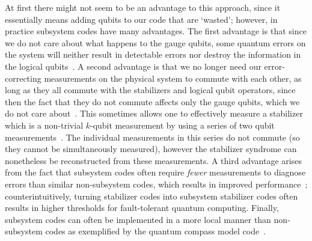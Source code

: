 \documentclass[twocolumn,showpacs,preprintnumbers,amsmath,amssymb,nofootinbib,pra,floatfix]{revtex4-1}
\begin{document}
At first there might not seem to be an advantage to this approach, since it essentially means adding qubits to our code that are
`wasted'; however, in practice subsystem codes have many advantages.  The first advantage is that since we do not care about what happens to the gauge qubits, some quantum errors on the system will neither result in detectable errors nor destroy the information in the logical qubits~\cite{Poulin:05a,Kribs:05a,Kribs:05b,Nielsen:05a,Kribs:06a,Bacon:06a}.  A second advantage is that we no longer need our error-correcting measurements on the physical system to commute with each other, as long as they all commute with the stabilizers and logical qubit operators, since then the fact that they do not commute affects only the gauge qubits, which we do not care about~\cite{Aliferis:07a}.  This sometimes allows one to effectively measure a stabilizer which is a non-trivial $k$-qubit measurement by using a series of two qubit measurements~\cite{Aliferis:07a}.  The individual measurements in this series do not commute (so they cannot be simultaneously measured), however the stabilizer syndrome can nonetheless be reconstructed from these measurements.  A third advantage arises from the fact that subsystem codes often require {\em fewer} measurements to diagnose errors than similar non-subsystem codes, which results in improved performance~\cite{Aliferis:07a,Cross:07a};  counterintuitively, turning stabilizer codes into subsystem stabilizer codes often results in higher thresholds for fault-tolerant quantum computing.  Finally, subsystem codes can often be implemented in a more local manner than non-subsystem codes as exemplified by the quantum compass model code~\cite{Bacon:06a,Aliferis:07a}.
\end{document}
